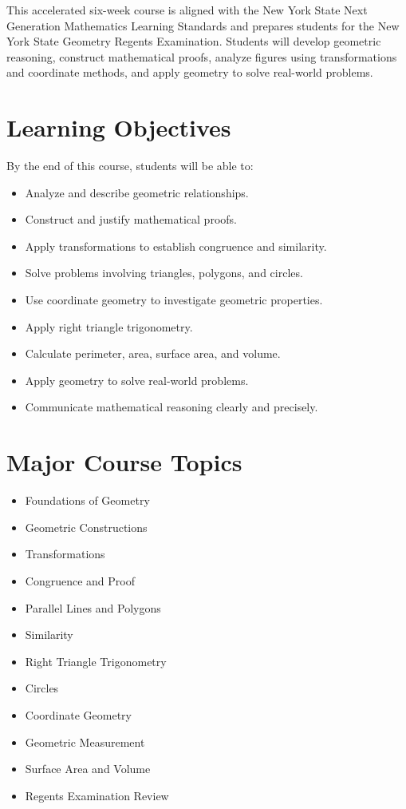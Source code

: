 \documentclass[10pt]{article}
\begin{document}
This accelerated six-week course is aligned with the New York State Next Generation Mathematics Learning Standards and prepares students for the New York State Geometry Regents Examination. Students will develop geometric reasoning, construct mathematical proofs, analyze figures using transformations and coordinate methods, and apply geometry to solve real-world problems.

\section*{Learning Objectives}

By the end of this course, students will be able to:

\begin{itemize}
    \item Analyze and describe geometric relationships.
    \item Construct and justify mathematical proofs.
    \item Apply transformations to establish congruence and similarity.
    \item Solve problems involving triangles, polygons, and circles.
    \item Use coordinate geometry to investigate geometric properties.
    \item Apply right triangle trigonometry.
    \item Calculate perimeter, area, surface area, and volume.
    \item Apply geometry to solve real-world problems.
    \item Communicate mathematical reasoning clearly and precisely.
\end{itemize}

\section*{Major Course Topics}

\begin{itemize}
    \item Foundations of Geometry
    \item Geometric Constructions
    \item Transformations
    \item Congruence and Proof
    \item Parallel Lines and Polygons
    \item Similarity
    \item Right Triangle Trigonometry
    \item Circles
    \item Coordinate Geometry
    \item Geometric Measurement
    \item Surface Area and Volume
    \item Regents Examination Review
\end{itemize}
\end{document}
